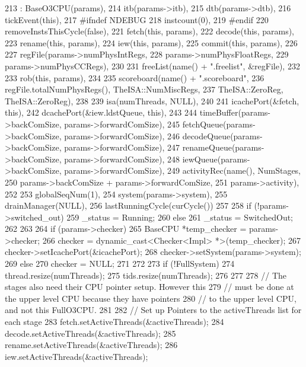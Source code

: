 \begin{DoxyCode}
213     : BaseO3CPU(params),
214       itb(params->itb),
215       dtb(params->dtb),
216       tickEvent(this),
217 #ifndef NDEBUG
218       instcount(0),
219 #endif
220       removeInstsThisCycle(false),
221       fetch(this, params),
222       decode(this, params),
223       rename(this, params),
224       iew(this, params),
225       commit(this, params),
226 
227       regFile(params->numPhysIntRegs,
228               params->numPhysFloatRegs,
229               params->numPhysCCRegs),
230 
231       freeList(name() + ".freelist", &regFile),
232 
233       rob(this, params),
234 
235       scoreboard(name() + ".scoreboard",
236                  regFile.totalNumPhysRegs(), TheISA::NumMiscRegs,
237                  TheISA::ZeroReg, TheISA::ZeroReg),
238 
239       isa(numThreads, NULL),
240 
241       icachePort(&fetch, this),
242       dcachePort(&iew.ldstQueue, this),
243 
244       timeBuffer(params->backComSize, params->forwardComSize),
245       fetchQueue(params->backComSize, params->forwardComSize),
246       decodeQueue(params->backComSize, params->forwardComSize),
247       renameQueue(params->backComSize, params->forwardComSize),
248       iewQueue(params->backComSize, params->forwardComSize),
249       activityRec(name(), NumStages,
250                   params->backComSize + params->forwardComSize,
251                   params->activity),
252 
253       globalSeqNum(1),
254       system(params->system),
255       drainManager(NULL),
256       lastRunningCycle(curCycle())
257 {
258     if (!params->switched_out) {
259         _status = Running;
260     } else {
261         _status = SwitchedOut;
262     }
263 
264     if (params->checker) {
265         BaseCPU *temp_checker = params->checker;
266         checker = dynamic_cast<Checker<Impl> *>(temp_checker);
267         checker->setIcachePort(&icachePort);
268         checker->setSystem(params->system);
269     } else {
270         checker = NULL;
271     }
272 
273     if (!FullSystem) {
274         thread.resize(numThreads);
275         tids.resize(numThreads);
276     }
277 
278     // The stages also need their CPU pointer setup.  However this
279     // must be done at the upper level CPU because they have pointers
280     // to the upper level CPU, and not this FullO3CPU.
281 
282     // Set up Pointers to the activeThreads list for each stage
283     fetch.setActiveThreads(&activeThreads);
284     decode.setActiveThreads(&activeThreads);
285     rename.setActiveThreads(&activeThreads);
286     iew.setActiveThreads(&activeThreads);
}
\end{DoxyCode}
